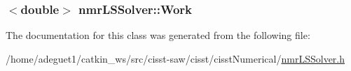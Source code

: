 \hypertarget{classnmr_l_s_solver_a4b87766126014f24e3a2dbc2c3ab3d31}{
\subsubsection[{Work}]{$<$double$>$ nmr\-L\-S\-Solver\-::\-Work\hspace{0.3cm}{\ttfamily [protected]}}}\label{classnmr_l_s_solver_a4b87766126014f24e3a2dbc2c3ab3d31}


The documentation for this class was generated from the following file\-:\begin{DoxyCompactItemize}
\item 
/home/adeguet1/catkin\-\_\-ws/src/cisst-\/saw/cisst/cisst\-Numerical/\hyperlink{nmr_l_s_solver_8h}{nmr\-L\-S\-Solver.\-h}\end{DoxyCompactItemize}
